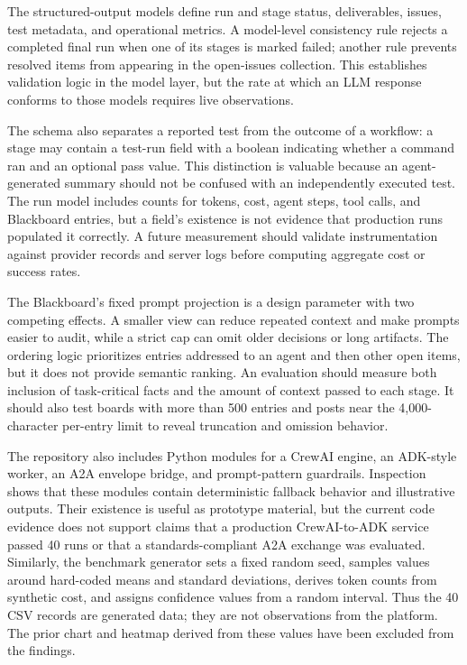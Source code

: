 \documentclass[12pt,onecolumn,draftclsnofoot]{IEEEtran}
\begin{document}
The structured-output models define run and stage status, deliverables, issues, test metadata, and operational metrics. A model-level consistency rule rejects a completed final run when one of its stages is marked failed; another rule prevents resolved items from appearing in the open-issues collection. This establishes validation logic in the model layer, but the rate at which an LLM response conforms to those models requires live observations.

The schema also separates a reported test from the outcome of a workflow: a stage may contain a test-run field with a boolean indicating whether a command ran and an optional pass value. This distinction is valuable because an agent-generated summary should not be confused with an independently executed test. The run model includes counts for tokens, cost, agent steps, tool calls, and Blackboard entries, but a field's existence is not evidence that production runs populated it correctly. A future measurement should validate instrumentation against provider records and server logs before computing aggregate cost or success rates.

The Blackboard's fixed prompt projection is a design parameter with two competing effects. A smaller view can reduce repeated context and make prompts easier to audit, while a strict cap can omit older decisions or long artifacts. The ordering logic prioritizes entries addressed to an agent and then other open items, but it does not provide semantic ranking. An evaluation should measure both inclusion of task-critical facts and the amount of context passed to each stage. It should also test boards with more than 500 entries and posts near the 4,000-character per-entry limit to reveal truncation and omission behavior.

The repository also includes Python modules for a CrewAI engine, an ADK-style worker, an A2A envelope bridge, and prompt-pattern guardrails. Inspection shows that these modules contain deterministic fallback behavior and illustrative outputs. Their existence is useful as prototype material, but the current code evidence does not support claims that a production CrewAI-to-ADK service passed 40 runs or that a standards-compliant A2A exchange was evaluated. Similarly, the benchmark generator sets a fixed random seed, samples values around hard-coded means and standard deviations, derives token counts from synthetic cost, and assigns confidence values from a random interval. Thus the 40 CSV records are generated data; they are not observations from the platform. The prior chart and heatmap derived from these values have been excluded from the findings.
\end{document}
